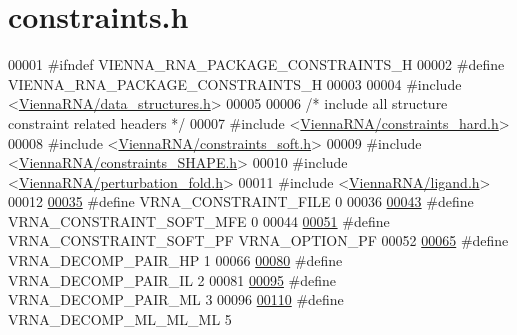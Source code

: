\hypertarget{constraints_8h_source}{}\section{constraints.\+h}
\label{constraints_8h_source}

\begin{DoxyCode}
00001 \textcolor{preprocessor}{#ifndef VIENNA\_RNA\_PACKAGE\_CONSTRAINTS\_H}
00002 \textcolor{preprocessor}{#define VIENNA\_RNA\_PACKAGE\_CONSTRAINTS\_H}
00003 
00004 \textcolor{preprocessor}{#include <\hyperlink{data__structures_8h}{ViennaRNA/data\_structures.h}>}
00005 
00006 \textcolor{comment}{/* include all structure constraint related headers */}
00007 \textcolor{preprocessor}{#include <\hyperlink{constraints__hard_8h}{ViennaRNA/constraints\_hard.h}>}
00008 \textcolor{preprocessor}{#include <\hyperlink{constraints__soft_8h}{ViennaRNA/constraints\_soft.h}>}
00009 \textcolor{preprocessor}{#include <\hyperlink{constraints__SHAPE_8h}{ViennaRNA/constraints\_SHAPE.h}>}
00010 \textcolor{preprocessor}{#include <\hyperlink{perturbation__fold_8h}{ViennaRNA/perturbation\_fold.h}>}
00011 \textcolor{preprocessor}{#include <\hyperlink{ligand_8h}{ViennaRNA/ligand.h}>}
00012 
\hypertarget{constraints_8h_source.tex_l00035}{}\hyperlink{group__constraints_ga62e0ed0c33002c09423de4e646f85a2b}{00035} \textcolor{preprocessor}{#define VRNA\_CONSTRAINT\_FILE      0}
00036 
\hypertarget{constraints_8h_source.tex_l00043}{}\hyperlink{group__constraints_ga62aa195893d02d1a79ca94952748df36}{00043} \textcolor{preprocessor}{#define VRNA\_CONSTRAINT\_SOFT\_MFE  0}
00044 
\hypertarget{constraints_8h_source.tex_l00051}{}\hyperlink{group__constraints_ga03fb5000c19b9a2082bf4ea30a543045}{00051} \textcolor{preprocessor}{#define VRNA\_CONSTRAINT\_SOFT\_PF   VRNA\_OPTION\_PF}
00052 
\hypertarget{constraints_8h_source.tex_l00065}{}\hyperlink{group__constraints_ga8bd41ebc8039378d242e4e8c273716a5}{00065} \textcolor{preprocessor}{#define VRNA\_DECOMP\_PAIR\_HP     1}
00066 
\hypertarget{constraints_8h_source.tex_l00080}{}\hyperlink{group__constraints_gaeab04f34d7730cff2d651d782f95d857}{00080} \textcolor{preprocessor}{#define VRNA\_DECOMP\_PAIR\_IL     2}
00081 
\hypertarget{constraints_8h_source.tex_l00095}{}\hyperlink{group__constraints_gaa15b1185673f0b9e900c4748d45f388f}{00095} \textcolor{preprocessor}{#define VRNA\_DECOMP\_PAIR\_ML     3}
00096 
\hypertarget{constraints_8h_source.tex_l00110}{}\hyperlink{group__constraints_ga735517266f2e35e1374b8f1ea77ef23e}{00110} \textcolor{preprocessor}{#define VRNA\_DECOMP\_ML\_ML\_ML    5}

\end{DoxyCode}

